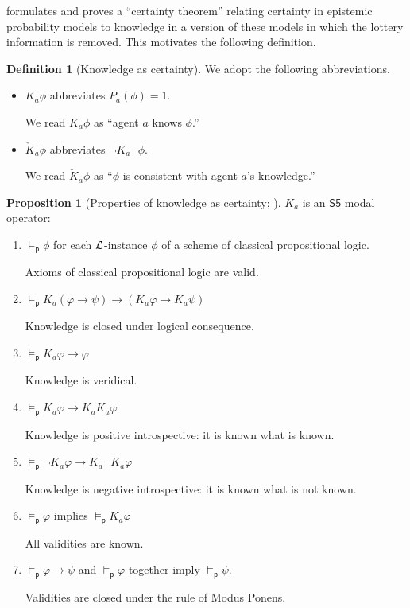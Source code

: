 \documentclass[12pt]{article}
\theoremstyle{definition}
\newtheorem{proposition}[theorem]{Proposition}
\newtheorem{definition}[theorem]{Definition}
\newcommand{\Lang}{{\cal L}}   %
\newcommand{\modelsp}{\models_{\mathsf{p}}}                  %
\begin{document}
\cite{Eijck2013:lap} formulates and proves a ``certainty theorem''
relating certainty in epistemic probability models to knowledge in a
version of these models in which the lottery information is removed.
This motivates the following definition.

\begin{definition}[Knowledge as certainty]
  We adopt the following abbreviations.
  \begin{itemize}
  \item $K_a\phi$ abbreviates $P_a(\phi)=1$. 

    We read $K_a\phi$ as ``agent $a$ knows $\phi$.''

  \item $\check K_a\phi$ abbreviates $\lnot K_a\lnot\phi$.

    We read $\check K_a\phi$ as ``$\phi$ is consistent with agent
    $a$'s knowledge.''
  \end{itemize}
\end{definition}

\begin{proposition}[Properties of knowledge as certainty;
  \cite{Eijck2013:lap}]
  \label{prop:knowledge}
  $K_a$ is an $\mathsf{S5}$ modal operator:
  \begin{enumerate}
  \item $\modelsp \phi$ for each $\Lang$-instance $\phi$ of a scheme
    of classical propositional logic.

    Axioms of classical propositional logic are valid.

  \item $\modelsp K_a(\varphi\to\psi)\to(K_a\varphi\to K_a\psi)$
    
    Knowledge is closed under logical consequence.

  \item $\modelsp K_a\varphi\to \varphi$

    Knowledge is veridical.
    
  \item $\modelsp K_a\varphi\to K_aK_a\varphi$

    Knowledge is positive introspective:  it is known what is known.
    
  \item $\modelsp \lnot K_a\varphi\to K_a\lnot K_a\varphi$

    Knowledge is negative introspective: it is known what is not
    known.
    
  \item $\modelsp\varphi$ implies $\modelsp K_a\varphi$

    All validities are known.

  \item $\modelsp\varphi\to\psi$ and $\modelsp\varphi$ together imply
    $\modelsp\psi$.

    Validities are closed under the rule of Modus Ponens.
  \end{enumerate}
\end{proposition}
\end{document}
